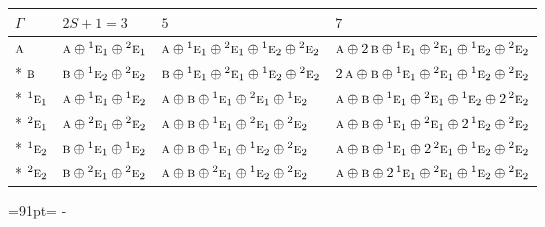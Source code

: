 \documentclass[10pt,a4paper]{article}
\newcommand{\needspace}[1]{\par\penalty-100\begingroup\dimen0=#1\relax\dimen2=\pagegoal
  \advance\dimen2-\pagetotal\ifdim\dimen0>\dimen2\relax\ifdim\dimen2>0pt\vfil\break\fi\fi
  \endgroup}
\numberwithin{equation}{section}
\newcommand{\irr}[1]{\text{\normalfont\scshape #1}}
\newcommand{\conjpair}[1]{{}^{#1}}
\begin{document}
{\small\setlength{\tabcolsep}{3pt}\begin{longtable}{@{}llll@{}}\toprule
$\Gamma$ & $2S + 1 = 3$ & $5$ & $7$\\\midrule\endhead
\bottomrule\endfoot\endlastfoot
$\irr{a}$ & $\irr{a}\oplus \conjpair{1}\irr{e}_{1}\oplus \conjpair{2}\irr{e}_{1}$ & $\irr{a}\oplus \conjpair{1}\irr{e}_{1}\oplus \conjpair{2}\irr{e}_{1}\oplus \conjpair{1}\irr{e}_{2}\oplus \conjpair{2}\irr{e}_{2}$ & $\irr{a}\oplus 2\,\irr{b}\oplus \conjpair{1}\irr{e}_{1}\oplus \conjpair{2}\irr{e}_{1}\oplus \conjpair{1}\irr{e}_{2}\oplus \conjpair{2}\irr{e}_{2}$\\*
$\irr{b}$ & $\irr{b}\oplus \conjpair{1}\irr{e}_{2}\oplus \conjpair{2}\irr{e}_{2}$ & $\irr{b}\oplus \conjpair{1}\irr{e}_{1}\oplus \conjpair{2}\irr{e}_{1}\oplus \conjpair{1}\irr{e}_{2}\oplus \conjpair{2}\irr{e}_{2}$ & $2\,\irr{a}\oplus \irr{b}\oplus \conjpair{1}\irr{e}_{1}\oplus \conjpair{2}\irr{e}_{1}\oplus \conjpair{1}\irr{e}_{2}\oplus \conjpair{2}\irr{e}_{2}$\\*
$\conjpair{1}\irr{e}_{1}$ & $\irr{a}\oplus \conjpair{1}\irr{e}_{1}\oplus \conjpair{1}\irr{e}_{2}$ & $\irr{a}\oplus \irr{b}\oplus \conjpair{1}\irr{e}_{1}\oplus \conjpair{2}\irr{e}_{1}\oplus \conjpair{1}\irr{e}_{2}$ & $\irr{a}\oplus \irr{b}\oplus \conjpair{1}\irr{e}_{1}\oplus \conjpair{2}\irr{e}_{1}\oplus \conjpair{1}\irr{e}_{2}\oplus 2\,\conjpair{2}\irr{e}_{2}$\\*
$\conjpair{2}\irr{e}_{1}$ & $\irr{a}\oplus \conjpair{2}\irr{e}_{1}\oplus \conjpair{2}\irr{e}_{2}$ & $\irr{a}\oplus \irr{b}\oplus \conjpair{1}\irr{e}_{1}\oplus \conjpair{2}\irr{e}_{1}\oplus \conjpair{2}\irr{e}_{2}$ & $\irr{a}\oplus \irr{b}\oplus \conjpair{1}\irr{e}_{1}\oplus \conjpair{2}\irr{e}_{1}\oplus 2\,\conjpair{1}\irr{e}_{2}\oplus \conjpair{2}\irr{e}_{2}$\\*
$\conjpair{1}\irr{e}_{2}$ & $\irr{b}\oplus \conjpair{1}\irr{e}_{1}\oplus \conjpair{1}\irr{e}_{2}$ & $\irr{a}\oplus \irr{b}\oplus \conjpair{1}\irr{e}_{1}\oplus \conjpair{1}\irr{e}_{2}\oplus \conjpair{2}\irr{e}_{2}$ & $\irr{a}\oplus \irr{b}\oplus \conjpair{1}\irr{e}_{1}\oplus 2\,\conjpair{2}\irr{e}_{1}\oplus \conjpair{1}\irr{e}_{2}\oplus \conjpair{2}\irr{e}_{2}$\\*
$\conjpair{2}\irr{e}_{2}$ & $\irr{b}\oplus \conjpair{2}\irr{e}_{1}\oplus \conjpair{2}\irr{e}_{2}$ & $\irr{a}\oplus \irr{b}\oplus \conjpair{2}\irr{e}_{1}\oplus \conjpair{1}\irr{e}_{2}\oplus \conjpair{2}\irr{e}_{2}$ & $\irr{a}\oplus \irr{b}\oplus 2\,\conjpair{1}\irr{e}_{1}\oplus \conjpair{2}\irr{e}_{1}\oplus \conjpair{1}\irr{e}_{2}\oplus \conjpair{2}\irr{e}_{2}$\\
\bottomrule\end{longtable}}
\needspace{91pt}
\end{document}
